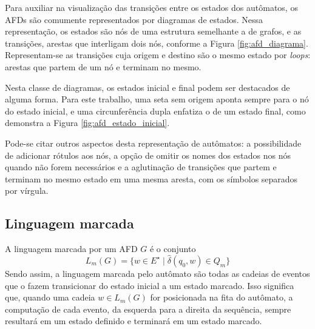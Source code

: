 Para auxiliar na visualização das transições entre os estados dos autômatos, os AFDs são comumente representados por diagramas de estados. Nessa representação, os estados são nós de uma estrutura semelhante a de grafos, e as transições, arestas que interligam dois nós, conforme a Figura \ref{fig:afd_diagrama}. Representam-se as transições cuja origem e destino são o mesmo estado por \textit{loops}: arestas que partem de um nó e terminam no mesmo.


Nesta classe de diagramas, os estados inicial e final podem ser destacados de alguma forma. Para este trabalho, uma seta sem origem aponta sempre para o nó do estado inicial, e uma circunferência dupla enfatiza o de um estado final, como demonstra a Figura \ref{fig:afd_estado_inicial}.


Pode-se citar outros aspectos desta representação de autômatos: a possibilidade de adicionar rótulos aos nós, a opção de omitir os nomes dos estados nos nós quando não forem necessários e a aglutinação de transições que partem e terminam no mesmo estado em uma mesma aresta, com os símbolos separados por vírgula.

\subsection{Linguagem marcada}

A linguagem marcada por um AFD $G$ é o conjunto $$L_m(G) = \{ w \in E^\star \mid \hat{\delta}(q_0, w) \in Q_m \}$$ Sendo assim, a linguagem marcada pelo autômato são todas as cadeias de eventos que o fazem transicionar do estado inicial a um estado marcado. Isso significa que, quando uma cadeia $w \in L_m(G)$ for posicionada na fita do autômato, a computação de cada evento, da esquerda para a direita da sequência, sempre resultará em um estado definido e terminará em um estado marcado.

